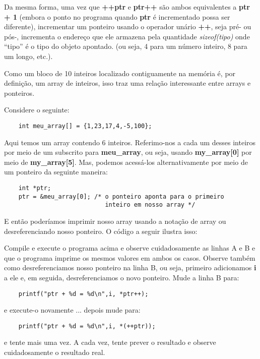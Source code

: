 Da mesma forma, uma vez que \textbf{++ptr} e \textbf{ptr++} são ambos equivalentes a \textbf{ptr + 1} (embora o ponto no programa quando \textbf{ptr} é incrementado possa ser diferente), incrementar um ponteiro usando o operador unário \textbf{++}, seja pré- ou pós-, incrementa o endereço que ele armazena pela quantidade \textit{sizeof(tipo)} onde ``tipo'' é o tipo do objeto apontado. (ou seja, 4 para um número inteiro, 8 para um longo, etc.).

Como um bloco de 10 inteiros localizado contiguamente na memória é, por definição, um array de inteiros, isso traz uma relação interessante entre arrays e ponteiros.

Considere o seguinte:
\begin{lstlisting}
	int meu_array[] = {1,23,17,4,-5,100};
\end{lstlisting}

Aqui temos um array contendo 6 inteiros. Referimo-nos a cada um desses inteiros por meio de um subscrito para \textbf{meu\_array}, ou seja, usando \textbf{my\_array[0]} por meio de \textbf{my\_array[5]}. Mas, podemos acessá-los alternativamente por meio de um ponteiro da seguinte maneira:

\begin{lstlisting}
	int *ptr;
	ptr = &meu_array[0]; /* o ponteiro aponta para o primeiro
	                        inteiro em nosso array */
\end{lstlisting}

E então poderíamos imprimir nosso array usando a notação de array ou desreferenciando nosso ponteiro. O código a seguir ilustra isso:



Compile e execute o programa acima e observe cuidadosamente as linhas A e B e que o programa imprime os mesmos valores em ambos os casos. Observe também como desreferenciamos nosso ponteiro na linha B, ou seja, primeiro adicionamos \textbf{i} a ele e, em seguida, desreferenciamos o novo ponteiro. Mude a linha B para:
\begin{lstlisting}
	printf("ptr + %d = %d\n",i, *ptr++);
\end{lstlisting}
e execute-o novamente ... depois mude para:
\begin{lstlisting}
	printf("ptr + %d = %d\n",i, *(++ptr));
\end{lstlisting}
e tente mais uma vez. A cada vez, tente prever o resultado e observe cuidadosamente o resultado real.

